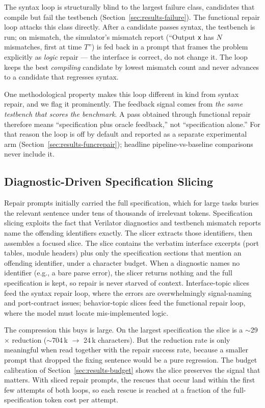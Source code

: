 The syntax loop is structurally blind to the largest failure class,
candidates that compile but fail the testbench
(Section~\ref{sec:results-failure}). The functional repair loop attacks
this class directly. After a candidate passes syntax, the testbench is run;
on mismatch, the simulator's mismatch report (``Output \texttt{x} has $N$
mismatches, first at time $T$'') is fed back in a prompt that frames the
problem explicitly as \emph{logic} repair --- the interface is correct, do
not change it. The loop keeps the best \emph{compiling} candidate by
lowest mismatch count and never advances to a candidate that regresses
syntax.

One methodological property makes this loop different in kind from syntax
repair, and we flag it prominently. The feedback signal comes from
\emph{the same testbench that scores the benchmark}. A pass obtained
through functional repair therefore means ``specification plus oracle
feedback,'' not ``specification alone.'' For that reason the loop is off
by default and reported as a separate experimental arm
(Section~\ref{sec:results-funcrepair}); headline pipeline-vs-baseline
comparisons never include it.

\subsection{Diagnostic-Driven Specification Slicing}
\label{sec:pipeline-slicing}

Repair prompts initially carried the full specification, which for large
tasks buries the relevant sentence under tens of thousands of irrelevant
tokens. Specification slicing exploits the fact that Verilator diagnostics
and testbench mismatch reports name the offending identifiers exactly. The
slicer extracts those identifiers, then assembles a focused slice. The slice contains the
verbatim interface excerpts (port tables, module headers) plus only the
specification sections that mention an offending identifier, under a
character budget. When a diagnostic names no identifier (e.g., a bare parse
error), the slicer returns nothing and the full specification is kept, so
repair is never starved of context. Interface-topic slices feed the
syntax repair loop, where the errors are overwhelmingly signal-naming and
port-contract issues; behavior-topic slices feed the functional repair
loop, where the model must locate mis-implemented logic.

The compression this buys is large. On the largest specification the
slice is a $\sim$29$\times$ reduction ($\sim$704\,k $\to$ 24\,k
characters). But the reduction rate is only meaningful when read
together with the repair success rate, because a smaller prompt that
dropped the fixing sentence would be a pure regression. The budget calibration of
Section~\ref{sec:results-budget} shows the slice preserves the signal
that matters. With sliced repair prompts, the rescues that occur land
within the first few attempts of both loops, so each rescue is reached
at a fraction of the full-specification token cost per attempt.


